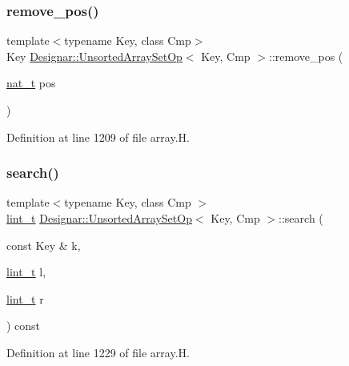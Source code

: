 \subsubsection{\texorpdfstring{remove\+\_\+pos()}{remove\_pos()}}
{\footnotesize\ttfamily template$<$typename Key, class Cmp$>$ \\
Key \hyperlink{class_designar_1_1_unsorted_array_set_op}{Designar\+::\+Unsorted\+Array\+Set\+Op}$<$ Key, Cmp $>$\+::remove\+\_\+pos (\begin{DoxyParamCaption}\item[{\hyperlink{namespace_designar_aa72662848b9f4815e7bf31a7cf3e33d1}{nat\+\_\+t}}]{pos }\end{DoxyParamCaption})\hspace{0.3cm}{\ttfamily [inline]}}



Definition at line 1209 of file array.\+H.

\mbox{\label{class_designar_1_1_unsorted_array_set_op_ac53cf73a36b29889fecf4bf06196e561}} 
\subsubsection{\texorpdfstring{search()}{search()}}
{\footnotesize\ttfamily template$<$typename Key, class Cmp $>$ \\
\hyperlink{namespace_designar_a9d113d66a39e82b73727c72cd3a52f73}{lint\+\_\+t} \hyperlink{class_designar_1_1_unsorted_array_set_op}{Designar\+::\+Unsorted\+Array\+Set\+Op}$<$ Key, Cmp $>$\+::search (\begin{DoxyParamCaption}\item[{const Key \&}]{k,  }\item[{\hyperlink{namespace_designar_a9d113d66a39e82b73727c72cd3a52f73}{lint\+\_\+t}}]{l,  }\item[{\hyperlink{namespace_designar_a9d113d66a39e82b73727c72cd3a52f73}{lint\+\_\+t}}]{r }\end{DoxyParamCaption}) const\hspace{0.3cm}{\ttfamily [protected]}}



Definition at line 1229 of file array.\+H.

\mbox{\label{class_designar_1_1_unsorted_array_set_op_a620fa45eb4c7ec033569321ecdb2eace}} 
